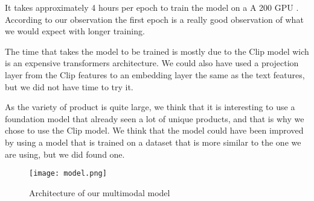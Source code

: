 It takes approximately 4 hours per epoch to train the model on a A 200 GPU . According to our observation the first epoch is a really good observation of what we would expect with longer training.

The time that takes the model to be trained is mostly due to the Clip model wich is an expensive transformers architecture. We could also have used a projection layer from the Clip features to an embedding layer the same as the text features, but we did not have time to try it.

As the variety of product is quite large, we think that it is interesting to use a foundation model that already seen a lot of unique products, and that is why we chose to use the Clip model. We think that the model could have been improved by using a model that is trained on a dataset that is more similar to the one we are using, but we did found one.

\begin{figure}[H]
    \centering
    \texttt{[image: model.png]}
    \caption{Architecture of our multimodal model}
    \label{fig:model}
\end{figure}